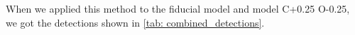 \documentclass[twoside, single, authoryear, semicolon]{lion-msc}
\newcommand{\4}{$_4$}
\newcommand{\3}{$_3$}
\newcommand{\2}{$_2$}
\begin{document}
When we applied this method to the fiducial model and model C+0.25 O-0.25, we got the detections shown in \autoref{tab: combined_detections}. 



\end{document}
